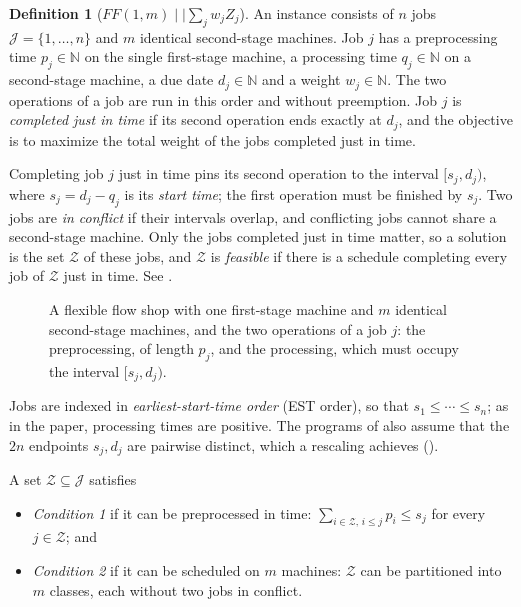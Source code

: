 \documentclass[11pt,a4paper]{article}
\theoremstyle{definition}
\newtheorem{definition}{Definition}
\theoremstyle{plain}
\newcommand{\FF}{FF(1,m)\mid\mid\textstyle\sum_j w_jZ_j}
\newcommand{\calJ}{\mathcal{J}}
\newcommand{\calZ}{\mathcal{Z}}
\begin{document}
\begin{definition}[$\FF$]
An instance consists of $n$ jobs $\calJ=\{1,\ldots,n\}$ and $m$ identical second-stage
machines. Job $j$ has a preprocessing time $p_j\in\mathbb N$ on the single first-stage machine, a
processing time $q_j\in\mathbb N$ on a second-stage machine, a due date $d_j\in\mathbb N$ and a
weight $w_j\in\mathbb N$. The two operations of a job are run in this order and without
preemption. Job $j$ is \emph{completed just in time} if its second operation ends exactly at
$d_j$, and the objective is to maximize the total weight of the jobs completed just in time.
\end{definition}
Completing job $j$ just in time pins its second operation to the interval $[s_j,d_j)$, where
$s_j=d_j-q_j$ is its \emph{start time}; the first operation must be finished by $s_j$. Two
jobs are \emph{in conflict} if their intervals overlap, and conflicting jobs cannot share a
second-stage machine. Only the jobs completed just in time matter, so a solution is the set
$\calZ$ of these jobs, and $\calZ$ is \emph{feasible} if there is a schedule completing
every job of $\calZ$ just in time. See .

\begin{figure}[tb]
    \centering
    
    \caption{A flexible flow shop with one first-stage machine and $m$ identical second-stage
    machines, and the two operations of a job $j$: the preprocessing, of length $p_j$, and the
    processing, which must occupy the interval $[s_j,d_j)$.}
    \label{fig:model}
\end{figure}

Jobs are indexed in \emph{earliest-start-time order} (EST order), so that
$s_1\le\cdots\le s_n$; as in the paper, processing times are positive. The programs of
 also assume that the $2n$ endpoints $s_j,d_j$ are pairwise
distinct, which a rescaling achieves ().

A set $\calZ\subseteq\calJ$ satisfies
\begin{itemize}
\item \emph{Condition 1} if it can be preprocessed in time:
  $\sum_{i\in\calZ,\,i\le j}p_i\le s_j$ for every $j\in\calZ$; and
\item \emph{Condition 2} if it can be scheduled on $m$ machines: $\calZ$ can be partitioned
  into $m$ classes, each without two jobs in conflict.
\end{itemize}
\end{document}
